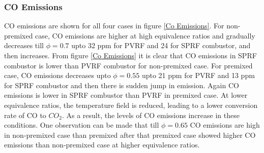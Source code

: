 \subsubsection{CO Emissions}
CO emissions are shown for all four cases in figure \ref{Co Emissions}. For non-premixed case, CO emissions are higher at high equivalence ratios and gradually decreases till $\phi = 0.7$ upto 32 ppm for PVRF and 24 for SPRF combustor, and then increases. From figure \ref{Co Emissions} it is clear that CO emissions in SPRF combustor is lower than PVRF combustor for non-premixed case. For premixed case, CO emissions decreases upto $\phi=0.55$ upto 21 ppm for PVRF and 13 ppm for SPRF combustor and then there is sudden jump in emission. Again CO emissions is lower in SPRF combustor than PVRF in premixed case. At lower equivalence ratios, the temperature field is reduced, leading to a lower conversion rate of CO to $CO_2$. As a result, the levels of CO emissions increase in these conditions. One observation can be made that till $\phi=0.65$ CO emissions are high in non-premixed case than premixed after that premixed case showed higher CO emissions than non-premixed case at higher equivalence ratios.
